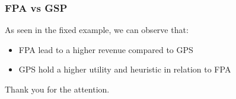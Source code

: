 \documentclass{beamer}
\begin{document}
\begin{frame}
\frametitle{FPA vs GSP}
As seen in the fixed example, we can observe that:
\begin{itemize}
\item FPA lead to a \alert{higher} revenue compared to GPS
\item GPS hold a \alert{higher} utility and heuristic in relation to FPA
\end{itemize}
\end{frame}

\begin{frame}
\centering 
\Huge{Thank you for the attention.}
\end{frame}
\end{document}
